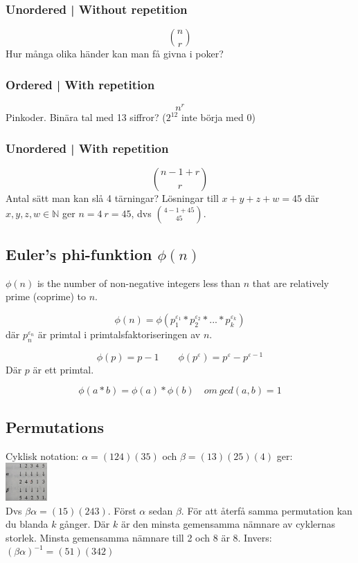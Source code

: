 \documentclass{article}
\begin{document}
\begin{multicols}{2}
{\begin{minipage}{28em}
\subsubsection{Unordered | Without repetition}
$$\binom{n}{r}$$
Hur många olika händer kan man få givna i poker?
\subsubsection{Ordered | With repetition}
$$n^r$$
Pinkoder. Binära tal med 13 siffror? ($2^{12}$ inte börja med 0)
\subsubsection{Unordered | With repetition}
$$\binom{n-1+r}{r}$$
Antal sätt man kan slå 4 tärningar? Lösningar till $x + y + z + w = 45$ där $x,y,z,w \in \mathbb{N}$ ger $n=4 \ r=45$, dvs $\binom{4-1+45}{45}$.

\end{minipage}}

\subsection{Euler's phi-funktion $\phi(n)$}

$\phi(n)$ is the number of non-negative integers less than $n$ that are relatively prime (coprime) to $n$.

$$\phi(n)=\phi(p^{\varepsilon_1}_1*p^{\varepsilon_2}_2*...*p^{\varepsilon_k}_k)$$
där $p^{\varepsilon_n}_n$ är primtal i primtalsfaktoriseringen av $n$.

$$\phi(p) = p-1 \quad \quad \phi(p^\varepsilon) = p^\varepsilon-p^{\varepsilon-1}$$
Där $p$ är ett primtal.

$$\phi(a*b) = \phi(a)*\phi(b) \quad om \ gcd(a,b)=1$$

\subsection{Permutations}

Cyklisk notation: $\alpha = (124)(35)$ och $\beta = (13)(25)(4)$ ger:\\
\includegraphics[width=0.12\textwidth]{partition}\\ Dvs $\beta \alpha = (15)(243)$. Först $\alpha$ sedan $\beta$. 
För att återfå samma permutation kan du blanda $k$ gånger. Där $k$ är den minsta gemensamma nämnare av cyklernas storlek. Minsta gemensamma nämnare till 2 och 8 är 8. Invers: $(\beta \alpha)^{-1} = (51)(342)$


\end{multicols}
\end{document}
